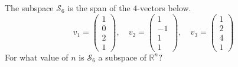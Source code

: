 \documentclass[cahier-main.tex]{subfiles}
\begin{document}
\begin{task} The subspace $\mathcal{S}_6$ is the span of the $4$-vectors below.
\[
v_1 = \begin{pmatrix} 1 \\ 0 \\ 2 \\ 1 \end{pmatrix}, \quad v_2 = \begin{pmatrix} 1 \\ -1\\ 1 \\ 1 \end{pmatrix} , \quad v_3 = \begin{pmatrix} 1 \\ 2 \\ 4 \\ 1 \end{pmatrix}
\]
For what value of $n$ is $\mathcal{S}_6$ a subspace of $\mathbb{R}^n$?
\end{task}
\end{document}

